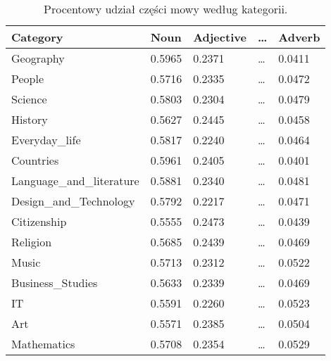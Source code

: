 \begin{table}[H]
    \centering
        \begin{tabular}{lllll}
            \toprule
                           Category &   Noun & Adjective & \ldots & Adverb \\
            \midrule
                          Geography & 0.5965 &    0.2371 & \ldots & 0.0411 \\
                             People & 0.5716 &    0.2335 & \ldots & 0.0472 \\
                            Science & 0.5803 &    0.2304 & \ldots & 0.0479 \\
                            History & 0.5627 &    0.2445 & \ldots & 0.0458 \\
                     Everyday\_life & 0.5817 &    0.2240 & \ldots & 0.0464 \\
                          Countries & 0.5961 &    0.2405 & \ldots & 0.0401 \\
          Language\_and\_literature & 0.5881 &    0.2340 & \ldots & 0.0481 \\
            Design\_and\_Technology & 0.5792 &    0.2217 & \ldots & 0.0471 \\
                        Citizenship & 0.5555 &    0.2473 & \ldots & 0.0439 \\
                           Religion & 0.5685 &    0.2439 & \ldots & 0.0469 \\
                              Music & 0.5713 &    0.2312 & \ldots & 0.0522 \\
                  Business\_Studies & 0.5633 &    0.2339 & \ldots & 0.0469 \\
                                 IT & 0.5591 &    0.2260 & \ldots & 0.0523 \\
                                Art & 0.5571 &    0.2385 & \ldots & 0.0504 \\
                        Mathematics & 0.5708 &    0.2354 & \ldots & 0.0529 \\
            \bottomrule
        \end{tabular}
        \caption{Procentowy udział części mowy według kategorii.}
        \label{tab:categories_pos_ratio}
\end{table}
